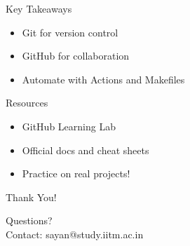 \documentclass[aspectratio=169]{beamer} %
\begin{document}
\begin{frame}{Key Takeaways}
  \begin{itemize}
    \item Git for version control
    \item GitHub for collaboration
    \item Automate with Actions and Makefiles
  \end{itemize}
\end{frame}

\begin{frame}{Resources}
  \begin{itemize}
    \item GitHub Learning Lab
    \item Official docs and cheat sheets
    \item Practice on real projects!
  \end{itemize}
\end{frame}

\begin{frame}{Thank You!}
  \begin{center}
    Questions? \\
    Contact: sayan@study.iitm.ac.in
  \end{center}
\end{frame}
\end{document}
